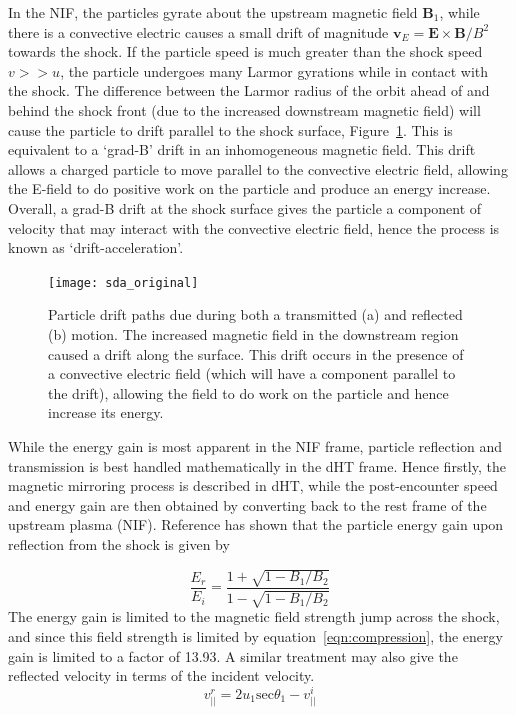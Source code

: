 In the NIF, the particles gyrate about the upstream magnetic field $\mathbf{B}_1$, while there is a convective electric causes a small drift of magnitude $\mathbf{v}_E = \mathbf{E}\times \mathbf{B}/B^2$ towards the shock. If the particle speed is much greater than the shock speed $v>>u$, the particle undergoes many Larmor gyrations while in contact with the shock. The difference between the Larmor radius of the orbit ahead of and behind the shock front (due to the increased downstream magnetic field) will cause the particle to drift parallel to the shock surface, Figure~\ref{fig:sda}. This is equivalent to a \textquoteleft grad-B' drift in an inhomogeneous magnetic field. This drift allows a charged particle to move parallel to the convective electric field, allowing the E-field to do positive work on the particle and produce an energy increase. Overall, a grad-B drift at the shock surface gives the particle a component of velocity that may interact with the convective electric field, hence the process is known as \textquoteleft drift-acceleration'.

\begin{figure}[!t] 
\begin{center}
\texttt{[image: sda\_original]}
\caption[Shock drift acceleration]{Particle drift paths due during both a transmitted (a) and reflected (b) motion. The increased magnetic field in the downstream region caused a drift along the surface. This drift occurs in the presence of a convective electric field (which will have a component parallel to the drift), allowing the field to do work on the particle and hence increase its energy.}
\label{fig:sda}
\end{center}
\end{figure}

While the energy gain is most apparent in the NIF frame, particle reflection and transmission is best handled mathematically in the dHT frame. Hence firstly, the magnetic mirroring process is described in dHT, while the post-encounter speed and energy gain are then obtained by converting back to the rest frame of the upstream plasma (NIF). Reference has shown that the particle energy gain upon reflection from the shock is given by 

\begin{equation}
\frac{E_r}{E_i} = \frac{1+\sqrt{1-B_1/B_2}}{1-\sqrt{1-B_1/B_2}}
\end{equation}
The energy gain is limited to the magnetic field strength jump across the shock, and since this field strength is limited by equation~\ref{eqn:compression}, the energy gain is limited to a factor of 13.93. A similar treatment may also give the reflected velocity in terms of the incident velocity.
\begin{equation}
v^r_{||} = 2u_1\mathrm{sec}\theta_1 - v^i_{||}
\end{equation}


